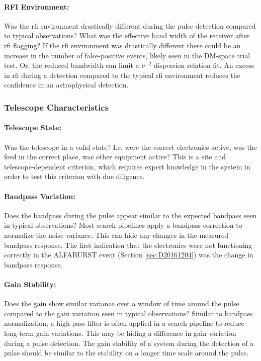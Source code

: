 \documentclass[a4paper,fleqn,usenatbib]{mnras}
\begin{document}
\paragraph{RFI Environment:}

Was the \gls{rfi} environment drastically different during the pulse detection
compared to typical observations? What was the effective band width of the
receiver after \gls{rfi} flagging? If the \gls{rfi} environment was drastically
different there could be an increase in the number of false-positive events,
likely seen in the DM-space trial test. Or, the reduced bandwidth can limit a
$\nu^{-2}$ dispersion relation fit. An excess in \gls{rfi} during a detection
compared to the typical \gls{rfi} environment reduces the confidence in an
astrophysical detection.

\subsubsection{Telescope Characteristics}

\paragraph{Telescope State:}

Was the telescope in a valid state? I.e. were the correct electronics active,
was the feed in the correct place, was other equipment active? This is a site
and telescope-dependent criterion, which requires expert knowledge in the
system in order to test this criterion with due diligence.

\paragraph{Bandpass Variation:}

Does the bandpass during the pulse appear similar to the expected bandpass seen
in typical observations? Most search pipelines apply a bandpass correction to
normalize the noise variance. This can hide any changes in the measured bandpass
response. The first indication that the electronics were not functioning
correctly in the ALFABURST event (Section \ref{sec:D20161204}) was the change in
bandpass response.

\paragraph{Gain Stability:}

Does the gain show similar variance over a window of time around the pulse
compared to the gain variation seen in typical observations? Similar to bandpass
normalization, a high-pass filter is often applied in a search pipeline to
reduce long-term gain variations. This may be hiding a difference in gain
variation during a pulse detection. The gain stability of a system during the
detection of a pulse should be similar to the stability on a longer time scale
around the pulse.
\end{document}
